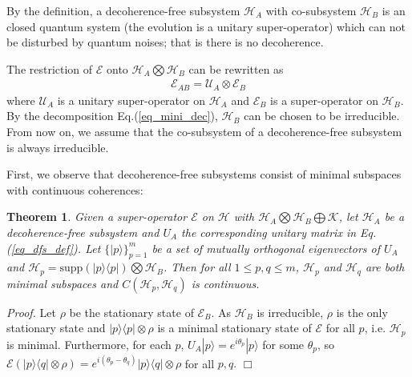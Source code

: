 \documentclass[journal]{IEEEtran}
\def\h{\ensuremath{\mathcal{H}}}
\def\u{\ensuremath{\mathcal{U}}}
\def\k{\ensuremath{\mathcal{K}}}
\def\u{\ensuremath{\mathcal{U}}}
\def\e{\ensuremath{\mathcal{E}}}
\def\k{\mathcal{K}}
\newtheorem{theorem}{Theorem}
\begin{document}
By the definition, a decoherence-free subsystem $\h_A$ with co-subsystem $\h_B$  is an closed quantum system (the evolution is a unitary super-operator) which can not be disturbed by quantum noises; that is there is no decoherence. 
 
The restriction of $\e$ onto $\h_A\bigotimes\h_B $ can be rewritten as \begin{eqnarray}\label{eq_dfs_form}
  \e_{AB}=\u_A\otimes \e_{B}
\end{eqnarray} where $\u_A$ is a unitary super-operator  on $\h_A$ and $\e_B$ is a super-operator on $\h_{B}.$ By the decomposition Eq.(\ref{eq_mini_dec}), $\h_B$ can be chosen to be  irreducible. From now on, we assume that the co-subsystem of a decoherence-free subsystem is always irreducible.

First, we observe that  decoherence-free subsystems consist of minimal subspaces with continuous coherences:
\begin{theorem}\label{Theo_dfs_cc}
    Given a super-operator $\e$ on $\h$ with $\h_A\bigotimes\h_B\bigoplus \k$, let $\h_A$ be a decoherence-free subsystem and $U_A$  the corresponding unitary matrix in Eq.(\ref{eq_dfs_def}). Let  $\{|p\rangle\}_{p=1}^{m}$ be a set of mutually orthogonal eigenvectors of $U_A$ and $\h_p=\textrm{supp}(|p\rangle\langle p|)\bigotimes \h_B$. Then for all $1\leq p,q\leq m$,  $\h_p$ and $\h_q$ are both minimal subspaces and
    $C(\h_p,\h_q)$ is continuous.
  \end{theorem}  

{\it Proof.} Let $\rho$ be the stationary state of $\e_B$. As $\h_B$ is irreducible, $\rho$ is the only stationary state and $|p\rangle\langle p|\otimes \rho$ is a minimal stationary state of $\e$ for all $p$, i.e. $\h_p$ is minimal. Furthermore, for each $p$, $U_A|p\rangle=e^{i\theta_p}|p\rangle$ for some $\theta_p$, so  $\e(|p\rangle\langle q|\otimes \rho)=e^{i(\theta_p-\theta_q)}|p\rangle\langle q|\otimes \rho$ for all $p,q.$
\hfill $\Box$
\end{document}
